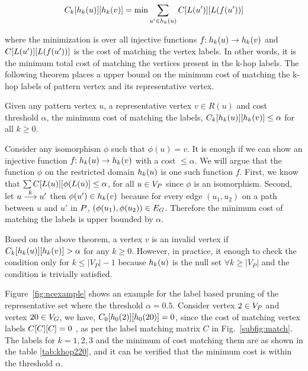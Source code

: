  \begin{equation}
  \khopcost{k}{u}{v} = \text{min}\displaystyle\sum_{u' \in \khopl{k}{u}} \matij{C}{L(u')}{L(f(u'))}
 \end{equation}

 where the minimization is over all injective functions
 $f\!\!:\khopl{k}{u} \rightarrow \khopl{k}{v}$ and 
$\matij{C}{L(u')}{L(f(u'))}$ is the cost of matching the vertex labels.
In other words, it is the minimum
 total cost of matching the vertices present in the k-hop labels. 
 The following theorem places a upper bound on the
 minimum cost of matching the k-hop labels of pattern vertex
 and its representative vertex.


\begin{thm}
Given any pattern vertex $u$, a representative vertex $v \in R(u)$ and cost
threshold $\alpha$, the minimum cost of matching the \khop labels, 
$\khopcost{k}{u}{v} \leq \alpha$ for all $k \geq 0$.

\begin{myproof}
Consider any isomorphism $\phi$
such that $\phi(u) = v$. It is enough if we can show an injective function
$f\!\!:\khopl{k}{u} \rightarrow \khopl{k}{v}$ with a cost
$\leq \alpha$. We will argue that the function $\phi$ on the restricted domain
$\khopl{k}{u}$ is one such function $f$.
First, we know that 
$\sum\matij{C}{L(u)}{\phi(L(u)} \leq \alpha$, for all $u \in \vp$ since
$\phi$ is an isomorphism. Second, let 
$\kpath{u}{u'}{k}$
then $\phi(u') \in \khopl{k}{v}$ because for every edge $(u_1, u_2)$ on a 
path between $u$ and $u'$ in $\pat$, $(\phi(u_1),\phi(u_2)) \in \eg$. 
Therefore the minimum cost of matching the \khop labels is upper bounded
by $\alpha$.
\end{myproof}
\label{thm:khop}
\end{thm}

Based on the above theorem, a vertex $v$ is an invalid vertex
if $\khopcost{k}{u}{v} > \alpha$ for any 
$k \geq 0$. However, in practice, it enough to check the condition only
for $k \leq |V_P|-1$ because $\khopl{k}{u}$ is the null set $\forall k \geq
|V_P|$ and the condition is trivially satisfied.

Figure~\ref{fig:ncexample} shows an example for the \khop label based
pruning of the representative set where the
threshold $\alpha = 0.5$. Consider vertex $2 \in \vp$ and vertex
$20 \in \vg$, we have, 
$\khopcost{0}{2}{20} = 0$, since the cost of matching vertex labels 
$\matij{C}{C}{C} = 0$ , 
as per the label matching matrix
$C$ in Fig.~\ref{subfig:match}. The \khop labels for $k=1,2,3$ and 
the minimum of cost matching them are
as shown in the table \ref{tab:khop220}, and it can be verified that
the minimum cost is within the threshold $\alpha$.

